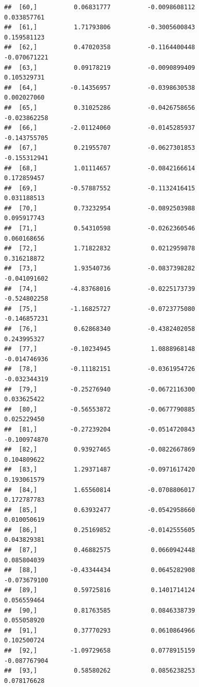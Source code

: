 \documentclass[11pt,preprint, authoryear]{elsarticle}
\numberwithin{equation}{section}
\numberwithin{figure}{section}
\numberwithin{table}{section}
\begin{document}
\begin{verbatim}
##  [60,]          0.06831777          -0.0098608112             0.033857761
##  [61,]          1.71793806          -0.3005600843             0.159581123
##  [62,]          0.47020358          -0.1164400448            -0.070671221
##  [63,]          0.09178219          -0.0090899409             0.105329731
##  [64,]         -0.14356957          -0.0398630538             0.002027060
##  [65,]          0.31025286          -0.0426758656            -0.023862258
##  [66,]         -2.01124060          -0.0145285937            -0.143755705
##  [67,]          0.21955707          -0.0627301853            -0.155312941
##  [68,]          1.01114657          -0.0842166614             0.172859457
##  [69,]         -0.57887552          -0.1132416415             0.031188513
##  [70,]          0.73232954          -0.0892503988             0.095917743
##  [71,]          0.54310598          -0.0262360546             0.060168656
##  [72,]          1.71822832           0.0212959878             0.316218872
##  [73,]          1.93540736          -0.0837398282            -0.041091602
##  [74,]         -4.83768016          -0.0225173739            -0.524802258
##  [75,]         -1.16825727          -0.0723775080            -0.146857231
##  [76,]          0.62868340          -0.4382402058             0.243995327
##  [77,]         -0.10234945           1.0888968148            -0.014746936
##  [78,]         -0.11182151          -0.0361954726            -0.032344319
##  [79,]         -0.25276940          -0.0672116300             0.033625422
##  [80,]         -0.56553872          -0.0677790885             0.025229450
##  [81,]         -0.27239204          -0.0514720843            -0.100974870
##  [82,]          0.93927465          -0.0822667869             0.104809622
##  [83,]          1.29371487          -0.0971617420             0.193061579
##  [84,]          1.65560814          -0.0708806017             0.172787783
##  [85,]          0.63932477          -0.0542958660             0.010050619
##  [86,]          0.25169852          -0.0142555605             0.043829381
##  [87,]          0.46882575           0.0660942448             0.085804039
##  [88,]         -0.43344434           0.0645282908            -0.073679100
##  [89,]          0.59725816           0.1401714124             0.056559464
##  [90,]          0.81763585           0.0846338739             0.055058920
##  [91,]          0.37770293           0.0610864966             0.102500724
##  [92,]         -1.09729658           0.0778915159            -0.087767904
##  [93,]          0.58580262           0.0856238253             0.078176628

\end{verbatim}
\end{document}
